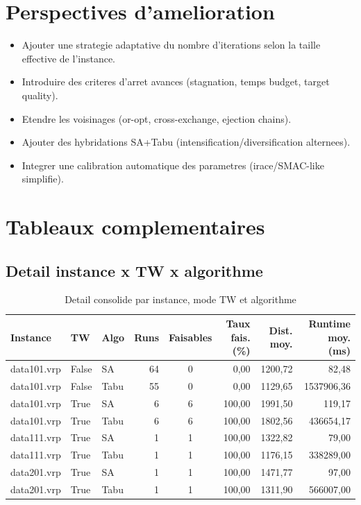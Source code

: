 \documentclass[12pt,a4paper]{report}
\begin{document}
\chapter*{Perspectives d'amelioration}
\begin{itemize}[leftmargin=1.2cm]
  \item Ajouter une strategie adaptative du nombre d'iterations selon la taille effective de l'instance.
  \item Introduire des criteres d'arret avances (stagnation, temps budget, target quality).
  \item Etendre les voisinages (or-opt, cross-exchange, ejection chains).
  \item Ajouter des hybridations SA+Tabu (intensification/diversification alternees).
  \item Integrer une calibration automatique des parametres (irace/SMAC-like simplifie).
\end{itemize}



\appendix

\chapter{Tableaux complementaires}

\section{Detail instance x TW x algorithme}
\begin{landscape}
\begin{table}[H]
\centering
\caption{Detail consolide par instance, mode TW et algorithme}
\begin{tabular}{lllrcrrr}
\toprule
Instance & TW & Algo & Runs & Faisables & Taux fais. (\%) & Dist. moy. & Runtime moy. (ms) \\
\midrule
data101.vrp & False & SA & 64 & 0 & 0,00 & 1200,72 & 82,48 \\
data101.vrp & False & Tabu & 55 & 0 & 0,00 & 1129,65 & 1537906,36 \\
data101.vrp & True & SA & 6 & 6 & 100,00 & 1991,50 & 119,17 \\
data101.vrp & True & Tabu & 6 & 6 & 100,00 & 1802,56 & 436654,17 \\
data111.vrp & True & SA & 1 & 1 & 100,00 & 1322,82 & 79,00 \\
data111.vrp & True & Tabu & 1 & 1 & 100,00 & 1176,15 & 338289,00 \\
data201.vrp & True & SA & 1 & 1 & 100,00 & 1471,77 & 97,00 \\
data201.vrp & True & Tabu & 1 & 1 & 100,00 & 1311,90 & 566007,00 \\
\bottomrule
\end{tabular}
\end{table}
\end{landscape}
\end{document}
